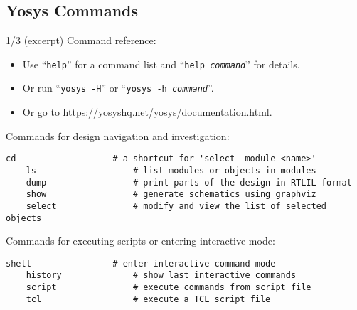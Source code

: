 
\subsection{Yosys Commands}

\begin{frame}[fragile]{\subsecname{} 1/3 \hspace{0pt plus 1 filll} (excerpt)}
Command reference:
\begin{itemize}
\item Use ``{\tt help}'' for a command list and ``{\tt help \it command}'' for details.
\item Or run ``{\tt yosys -H}'' or ``{\tt yosys -h \it command}''.
\item Or go to \url{https://yosyshq.net/yosys/documentation.html}.
\end{itemize}

\bigskip
Commands for design navigation and investigation:
\begin{lstlisting}[xleftmargin=1cm, basicstyle=\ttfamily\fontsize{8pt}{10pt}\selectfont, language=ys]
    cd                   # a shortcut for 'select -module <name>'
    ls                   # list modules or objects in modules
    dump                 # print parts of the design in RTLIL format
    show                 # generate schematics using graphviz
    select               # modify and view the list of selected objects
\end{lstlisting}

\bigskip
Commands for executing scripts or entering interactive mode:
\begin{lstlisting}[xleftmargin=1cm, basicstyle=\ttfamily\fontsize{8pt}{10pt}\selectfont, language=ys]
    shell                # enter interactive command mode
    history              # show last interactive commands
    script               # execute commands from script file
    tcl                  # execute a TCL script file
\end{lstlisting}
\end{frame}


